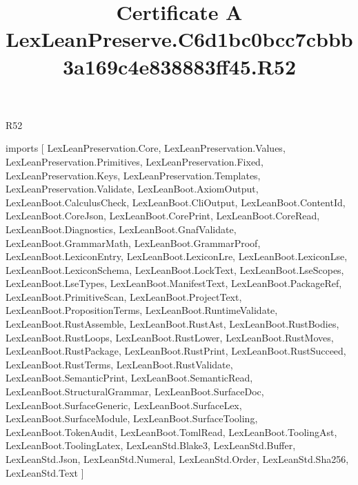 \begin{lexlean}{R52}
\title{Certificate A LexLeanPreserve.C6d1bc0bcc7cbbb3a169c4e838883ff45.R52}
\begin{coremodule}
imports [
  LexLeanPreservation.Core,
  LexLeanPreservation.Values,
  LexLeanPreservation.Primitives,
  LexLeanPreservation.Fixed,
  LexLeanPreservation.Keys,
  LexLeanPreservation.Templates,
  LexLeanPreservation.Validate,
  LexLeanBoot.AxiomOutput,
  LexLeanBoot.CalculusCheck,
  LexLeanBoot.CliOutput,
  LexLeanBoot.ContentId,
  LexLeanBoot.CoreJson,
  LexLeanBoot.CorePrint,
  LexLeanBoot.CoreRead,
  LexLeanBoot.Diagnostics,
  LexLeanBoot.GnafValidate,
  LexLeanBoot.GrammarMath,
  LexLeanBoot.GrammarProof,
  LexLeanBoot.LexiconEntry,
  LexLeanBoot.LexiconLre,
  LexLeanBoot.LexiconLse,
  LexLeanBoot.LexiconSchema,
  LexLeanBoot.LockText,
  LexLeanBoot.LseScopes,
  LexLeanBoot.LseTypes,
  LexLeanBoot.ManifestText,
  LexLeanBoot.PackageRef,
  LexLeanBoot.PrimitiveScan,
  LexLeanBoot.ProjectText,
  LexLeanBoot.PropositionTerms,
  LexLeanBoot.RuntimeValidate,
  LexLeanBoot.RustAssemble,
  LexLeanBoot.RustAst,
  LexLeanBoot.RustBodies,
  LexLeanBoot.RustLoops,
  LexLeanBoot.RustLower,
  LexLeanBoot.RustMoves,
  LexLeanBoot.RustPackage,
  LexLeanBoot.RustPrint,
  LexLeanBoot.RustSucceed,
  LexLeanBoot.RustTerms,
  LexLeanBoot.RustValidate,
  LexLeanBoot.SemanticPrint,
  LexLeanBoot.SemanticRead,
  LexLeanBoot.StructuralGrammar,
  LexLeanBoot.SurfaceDoc,
  LexLeanBoot.SurfaceGeneric,
  LexLeanBoot.SurfaceLex,
  LexLeanBoot.SurfaceModule,
  LexLeanBoot.SurfaceTooling,
  LexLeanBoot.TokenAudit,
  LexLeanBoot.TomlRead,
  LexLeanBoot.ToolingAst,
  LexLeanBoot.ToolingLatex,
  LexLeanStd.Blake3,
  LexLeanStd.Buffer,
  LexLeanStd.Json,
  LexLeanStd.Numeral,
  LexLeanStd.Order,
  LexLeanStd.Sha256,
  LexLeanStd.Text
]


\end{coremodule}
\end{lexlean}
